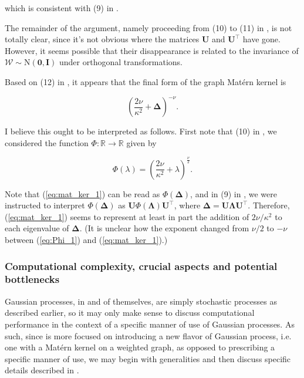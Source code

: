 which is consistent with (9) in \cite{pmlr-v130-borovitskiy21a}.

The remainder of the argument, namely proceeding from (10) to (11) in \cite{pmlr-v130-borovitskiy21a}, is not totally clear, since it's not obvious where the matrices $\mathbf U$ and $\mathbf U^\intercal$ have gone. However, it seems possible that their disappearance is related to the invariance of $\bm{\mathcal W} \sim \mathrm N(\mathbf 0, \mathbf I)$ under orthogonal transformations.

Based on (12) in \cite{pmlr-v130-borovitskiy21a}, it appears that the final form of the graph Mat\'{e}rn kernel is

\begin{equation}\label{eq:mat_ker_1}
    \left(\frac{2\nu}{\kappa^2} + \bm \Delta \right)^{-\nu}.
\end{equation}

I believe this ought to be interpreted as follows. First note that (10) in \cite{pmlr-v130-borovitskiy21a}, we considered the function $\Phi \colon \mathbb R \to \mathbb R$ given by

\begin{equation}\label{eq:Phi_1}
    \Phi(\lambda) = \left(\frac{2\nu}{\kappa^2} + \lambda\right)^{\frac{\nu}{2}}.
\end{equation}

Note that (\ref{eq:mat_ker_1}) can be read as $\Phi(\bm \Delta)$, and in (9) in \cite{pmlr-v130-borovitskiy21a}, we were instructed to interpret $\Phi(\bm \Delta)$ as $\mathbf U \Phi(\bm \Lambda) \mathbf U^\intercal$, where $\bm \Delta = \mathbf U \bm \Lambda \mathbf U^{\intercal}$. Therefore, (\ref{eq:mat_ker_1}) seems to represent at least in part the addition of $2\nu / \kappa^2$ to each eigenvalue of $\bm \Delta$. (It is unclear how the exponent changed from $\nu / 2$ to $- \nu$ between (\ref{eq:Phi_1}) and (\ref{eq:mat_ker_1}).)

\subsubsection{Computational complexity, crucial aspects and potential bottlenecks}

Gaussian processes, in and of themselves, are simply stochastic processes as described earlier, so it may only make sense to discuss computational performance in the context of a specific manner of use of Gaussian processes. As such, since \cite{pmlr-v130-borovitskiy21a} is more focused on introducing a new flavor of Gaussian process, i.e. one with a Mat\'{e}rn kernel on a weighted graph, as opposed to prescribing a specific manner of use, we may begin with generalities and then discuss specific details described in \cite{pmlr-v130-borovitskiy21a}.

